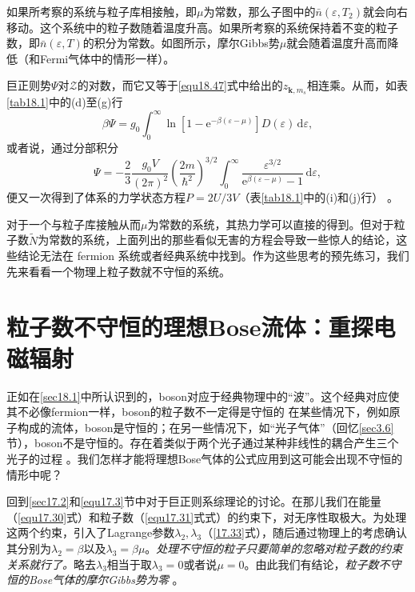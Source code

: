 如果所考察的系统与粒子库相接触，即$\mu$为常数，那么子图中的$\bar{n}(\varepsilon,T_2)$就会向右移动。这个系统中的粒子数随着温度升高。如果所考察的系统保持着不变的粒子数，即$\bar{n}(\varepsilon,T)$的积分为常数。如图所示，摩尔Gibbs势$\mu$就会随着温度升高而降低（和Fermi气体中的情形一样）。

巨正则势$\Psi$对$\mathcal Z$的对数，而它又等于\eqref{equ18.47}式中给出的$z_{{\mathbf k},m_s}$相连乘。从而，如表\ref{tab18.1}中的(d)至(g)行
\begin{equation}
\beta\Psi=g_0\int_0^\infty \ln[1-\mathrm e^{-\beta(\varepsilon-\mu)}]D(\varepsilon)\,\mathrm d\varepsilon,
\end{equation}
或者说，通过分部积分
\begin{equation}
\Psi=-\frac{2}{3}\frac{g_0V}{(2\pi)^2}\left(\frac{2m}{\hbar^2}\right)^{3/2}\int_0^\infty\frac{\varepsilon^{3/2}}{\mathrm e^{\beta(\varepsilon-\mu)}-1}\,\mathrm d\varepsilon,
\label{equ18.51}
\end{equation}
便又一次得到了体系的力学状态方程$P=2U/3V$（表\ref{tab18.1}中的(i)和(j)行）%
%
。

对于一个与粒子库接触从而$\mu$为常数的系统，其热力学可以直接的得到。但对于粒子数$\tilde N$为常数的系统，上面列出的那些看似无害的方程会导致一些惊人的结论，这些结论无法在 fermion 系统或者经典系统中找到。作为这些思考的预先练习，我们先来看看一个物理上粒子数就不守恒的系统。

\section{粒子数不守恒的理想Bose流体：重探电磁辐射}\label{sec18.6}
正如在\ref{sec18.1}中所认识到的，boson对应于经典物理中的``波''。这个经典对应使其不必像fermion一样，boson的粒子数不一定得是守恒的%
%
在某些情况下，例如原子构成的流体，boson是守恒的；在另一些情况下，如``光子气体''（回忆\ref{sec3.6}节），boson不是守恒的。存在着类似于两个光子通过某种非线性的耦合产生三个光子的过程%
%
。我们怎样才能将理想Bose气体的公式应用到这可能会出现不守恒的情形中呢？

回到\ref{sec17.2}和\ref{equ17.3}节中对于巨正则系综理论的讨论。在那儿我们在能量（\eqref{equ17.30}式）和粒子数（\eqref{equ17.31}式式）的约束下，对无序性取极大。为处理这两个约束，引入了Lagrange参数$\lambda_2,\lambda_3$（\eqref{17.33}式），随后通过物理上的考虑确认其分别为$\lambda_2=\beta$以及$\lambda_3=\beta\mu$。{\it 处理不守恒的粒子只要简单的忽略对粒子数的约束关系就行了。}略去$\lambda_3$相当于取$\lambda_3=0$或者说$\mu=0$。由此我们有结论，{\it 粒子数不守恒的Bose气体的摩尔Gibbs势为零}%
%
。

